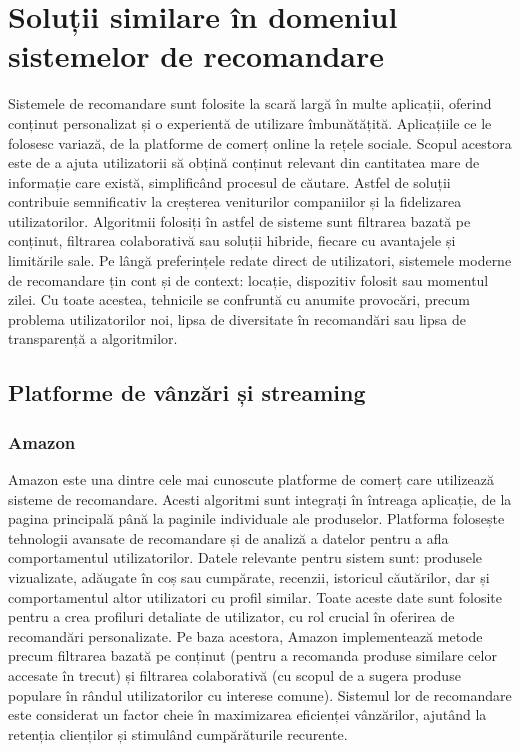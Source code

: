 \chapter{Soluții similare în domeniul sistemelor de recomandare}
\label{chap:ch2}

Sistemele de recomandare sunt folosite la scară largă în multe aplicații, oferind conținut personalizat și o experientă de utilizare îmbunătățită. 
Aplicațiile ce le folosesc variază, de la platforme de comerț online la rețele sociale.
Scopul acestora este de a ajuta utilizatorii să obțină conținut relevant din cantitatea mare de informație care există, simplificând procesul de căutare.
Astfel de soluții contribuie semnificativ la creșterea veniturilor companiilor și la fidelizarea utilizatorilor.
Algoritmii folosiți în astfel de sisteme sunt filtrarea bazată pe conținut, filtrarea colaborativă sau soluții hibride, fiecare cu avantajele și limitările sale.
Pe lângă preferințele redate direct de utilizatori, sistemele moderne de recomandare țin cont și de context: locație, dispozitiv folosit sau momentul zilei.
Cu toate acestea, tehnicile se confruntă cu anumite provocări, precum problema utilizatorilor noi, lipsa de diversitate în recomandări sau lipsa de transparență a algoritmilor.

\section{Platforme de vânzări și streaming}
\label{sec:ch2sec1}
\subsection*{Amazon}
Amazon este una dintre cele mai cunoscute platforme de comerț care utilizează sisteme de recomandare.
Acesti algoritmi sunt integrați în întreaga aplicație, de la pagina principală până la paginile individuale ale produselor.
Platforma folosește tehnologii avansate de recomandare și de analiză a datelor pentru a afla comportamentul utilizatorilor.
Datele relevante pentru sistem sunt: produsele vizualizate, adăugate în coș sau cumpărate, recenzii, istoricul căutărilor, dar și comportamentul altor utilizatori cu profil similar. 
Toate aceste date sunt folosite pentru a crea profiluri detaliate de utilizator, cu rol crucial în oferirea de recomandări personalizate.
Pe baza acestora, Amazon implementează metode precum filtrarea bazată pe conținut (pentru a recomanda produse similare celor accesate în trecut) și filtrarea colaborativă (cu scopul de a sugera produse populare în rândul utilizatorilor cu interese comune).
Sistemul lor de recomandare este considerat un factor cheie în maximizarea eficienței vânzărilor, ajutând la retenția clienților și stimulând cumpărăturile recurente\cite{ahmed2022amazon, smith2017two}.

